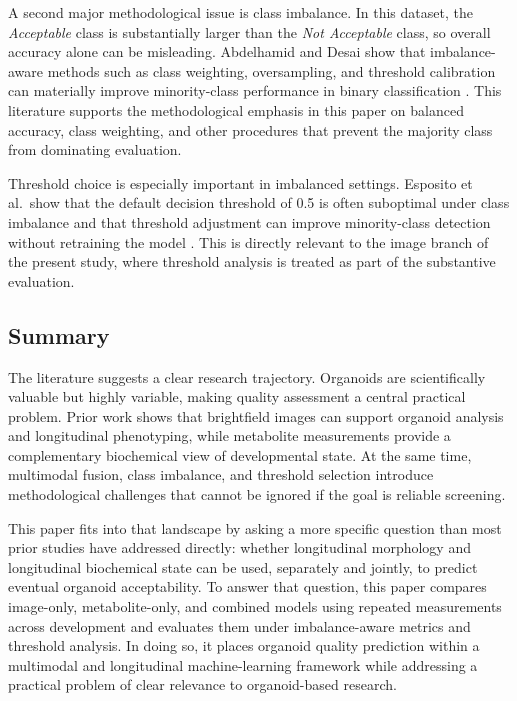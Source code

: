 \documentclass{article}
\begin{document}
A second major methodological issue is class imbalance. In this dataset, the \textit{Acceptable} class is substantially larger than the \textit{Not Acceptable} class, so overall accuracy alone can be misleading. Abdelhamid and Desai show that imbalance-aware methods such as class weighting, oversampling, and threshold calibration can materially improve minority-class performance in binary classification \cite{abdelhamid2024}. This literature supports the methodological emphasis in this paper on balanced accuracy, class weighting, and other procedures that prevent the majority class from dominating evaluation.

Threshold choice is especially important in imbalanced settings. Esposito et al.\ show that the default decision threshold of 0.5 is often suboptimal under class imbalance and that threshold adjustment can improve minority-class detection without retraining the model \cite{esposito2021}. This is directly relevant to the image branch of the present study, where threshold analysis is treated as part of the substantive evaluation.

\subsection{Summary}

The literature suggests a clear research trajectory. Organoids are scientifically valuable but highly variable, making quality assessment a central practical problem. Prior work shows that brightfield images can support organoid analysis and longitudinal phenotyping, while metabolite measurements provide a complementary biochemical view of developmental state. At the same time, multimodal fusion, class imbalance, and threshold selection introduce methodological challenges that cannot be ignored if the goal is reliable screening.

This paper fits into that landscape by asking a more specific question than most prior studies have addressed directly: whether longitudinal morphology and longitudinal biochemical state can be used, separately and jointly, to predict eventual organoid acceptability. To answer that question, this paper compares image-only, metabolite-only, and combined models using repeated measurements across development and evaluates them under imbalance-aware metrics and threshold analysis. In doing so, it places organoid quality prediction within a multimodal and longitudinal machine-learning framework while addressing a practical problem of clear relevance to organoid-based research.
\end{document}
